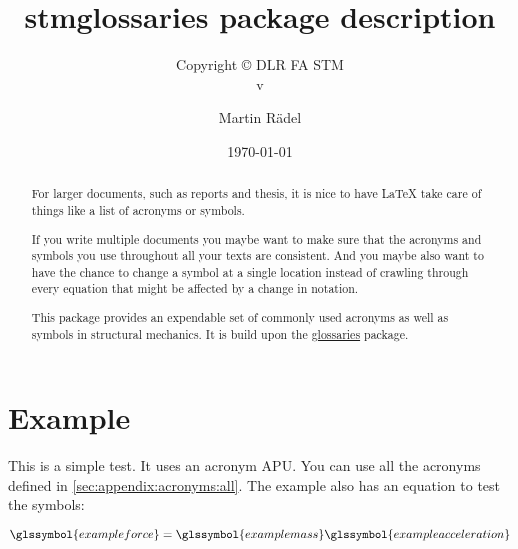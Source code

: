 \documentclass{scrartcl}
\author{Martin R\"{a}del}
\title{stmglossaries package description}
\subtitle{Copyright \copyright{} \the\year{} DLR FA STM\\v\formatdate[versiondatestyle]{\DTMToday}}
\date{\today}
\begin{document}
\maketitle

\begin{abstract}
For larger documents, such as reports and thesis, it is nice to have \LaTeX{} take care of things like a list of acronyms or symbols.

If you write multiple documents you maybe want to make sure that the acronyms and symbols you use throughout all your texts are consistent. And you maybe also want to have the chance to change a symbol at a single location instead of crawling through every equation that might be affected by a change in notation.

This package provides an expendable set of commonly used acronyms as well as symbols in structural mechanics. It is build upon the \href{https://ctan.org/pkg/glossaries?lang=en}{glossaries} package.
\end{abstract}

\tableofcontents

\section{Example}

This is a simple test. It uses an acronym \gls{APU}. You can use all the acronyms defined in \autoref{sec:appendix:acronyms:all}. The example also has an equation to test the symbols:


\begin{equation}  
\glssymbol{exampleforce} = \glssymbol{examplemass}\glssymbol{exampleacceleration}
\end{equation}

% 
% 
\end{document}
